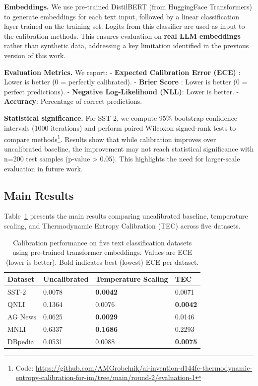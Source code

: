 \documentclass[11pt,letterpaper]{article}
\begin{document}
\textbf{Embeddings.} We use pre-trained DistilBERT (from HuggingFace Transformers) to generate embeddings for each text input, followed by a linear classification layer trained on the training set. Logits from this classifier are used as input to the calibration methods. This ensures evaluation on \textbf{real LLM embeddings} rather than synthetic data, addressing a key limitation identified in the previous version of this work.

\textbf{Evaluation Metrics.} We report:
- \textbf{Expected Calibration Error (ECE)} \cite{Guo2017}: Lower is better (0 = perfectly calibrated).
- \textbf{Brier Score} \cite{Brier1950}: Lower is better (0 = perfect predictions).
- \textbf{Negative Log-Likelihood (NLL)}: Lower is better.
- \textbf{Accuracy}: Percentage of correct predictions.

\textbf{Statistical significance.} For SST-2, we compute 95\% bootstrap confidence intervals (1000 iterations) and perform paired Wilcoxon signed-rank tests to compare methods\footnote{Code: \url{https://github.com/AMGrobelnik/ai-invention-d144fc-thermodynamic-entropy-calibration-for-im/tree/main/round-2/evaluation-1}}. Results show that while calibration improves over uncalibrated baseline, the improvement may not reach statistical significance with n=200 test samples (p-value > 0.05). This highlights the need for larger-scale evaluation in future work.

\subsection{Main Results}
\label{sec:results}

Table~\ref{tab:main_results} presents the main results comparing uncalibrated baseline, temperature scaling, and Thermodynamic Entropy Calibration (TEC) across five datasets.

\begin{table}[!htbp]
  \centering
  \begin{tabular}{llll}
    \toprule
    Dataset & Uncalibrated & Temperature Scaling & TEC \\
    \midrule
    SST-2 & 0.0078 & \textbf{0.0042} & 0.0071 \\
    QNLI & 0.1364 & 0.0076 & \textbf{0.0042} \\
    AG News & 0.0625 & \textbf{0.0029} & 0.0146 \\
    MNLI & 0.6337 & \textbf{0.1686} & 0.2293 \\
    DBpedia & 0.0531 & 0.0088 & \textbf{0.0075} \\
    \bottomrule
  \end{tabular}
  \caption{Calibration performance on five text classification datasets using pre-trained transformer embeddings. Values are ECE (lower is better). Bold indicates best (lowest) ECE per dataset.}
  \label{tab:main_results}
\end{table}
\end{document}
